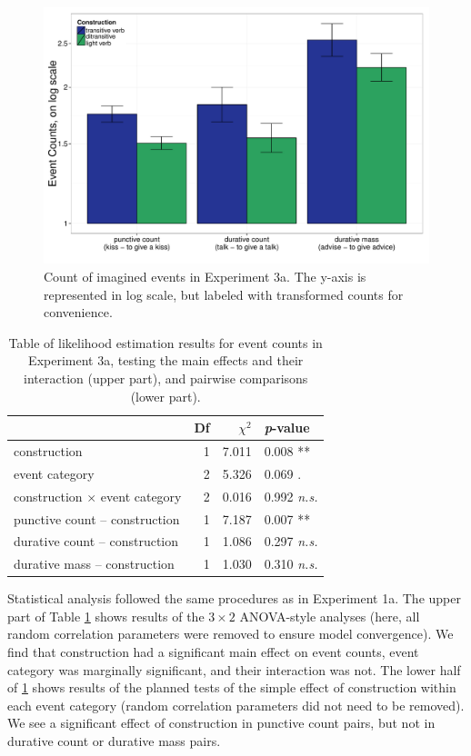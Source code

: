 \documentclass[review,12pt,authoryear]{elsarticle}
\begin{document}
\begin{figure}
\centering
\includegraphics[width=\textwidth]{./Figures/Exp3a_EventCountsBar.pdf}
\caption{Count of imagined events in Experiment 3a. The y-axis is represented in log scale, but labeled with transformed counts  for convenience.  }
\label{fig_resCount}
\end{figure}



\begin{table}[ht]
\centering
\begin{tabular}{lrrl}
  \hline
 & Df &  $\chi^2$ & \emph{p}-value \\ 
  \hline
construction          & 1 &  7.011 & 0.008 ** \\ 
  event category          & 2 &  5.326 & 0.069 .\\ 
  construction $\times$ event category & 2 & 0.016 & 0.992 \emph{n.s.} \\    \hline
   punctive count -- construction    & 1 & 7.187 & 0.007 ** \\    
   durative count -- construction    & 1  & 1.086 & 0.297 \emph{n.s.}\\ 
   durative mass -- construction   & 1 &  1.030 & 0.310 \emph{n.s.}\\ \hline
\end{tabular}
\caption{Table of likelihood estimation results for event counts in Experiment 3a, testing the main effects and their interaction (upper part), and pairwise comparisons (lower part).}
\label{tab_countsregr3}
\end{table}

Statistical analysis followed the same procedures as in Experiment 1a.  The upper part of Table \ref{tab_countsregr3} shows results of the $3 \times 2$ ANOVA-style analyses (here, all random correlation parameters were removed to ensure model convergence).  We find that construction had a significant main effect on event counts, event category was marginally significant, and their interaction was not.  The lower half of  \ref{tab_countsregr3} shows results of the planned tests of the simple effect of construction within each event category (random correlation parameters did not need to be removed).  We see a significant effect of construction in punctive count pairs, but not in durative count or durative mass pairs.
\end{document}
